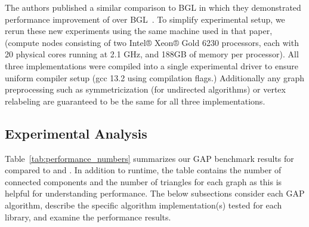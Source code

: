 The \nwgraph authors published a similar comparison to BGL in which they
demonstrated performance improvement of \nwgraph over BGL~\cite{REF_nwgraph_paper}.
To simplify experimental setup, we rerun these new experiments using the same machine used in that paper,
(compute nodes consisting of two Intel® Xeon® Gold 6230 processors, each with 20 physical cores running at 2.1 GHz,
and 188GB of memory per processor).
All three implementations were compiled into a single experimental driver to ensure uniform compiler setup (gcc 13.2 using  compilation flags.)
Additionally any graph preprocessing such as symmetricization (for undirected algorithms) or vertex relabeling are guaranteed to be the same for all three implementations.

\subsection{Experimental Analysis}

Table~\ref{tab:performance_numbers} summarizes our GAP benchmark results for \stdgraph compared to \bgl and \nwgraph.
In addition to runtime, the table contains the number of connected components and the number of
triangles for each graph as this is helpful for understanding performance.
The below subsections consider each GAP algorithm, describe the specific algorithm implementation(s)
tested for each library, and examine the performance results.

